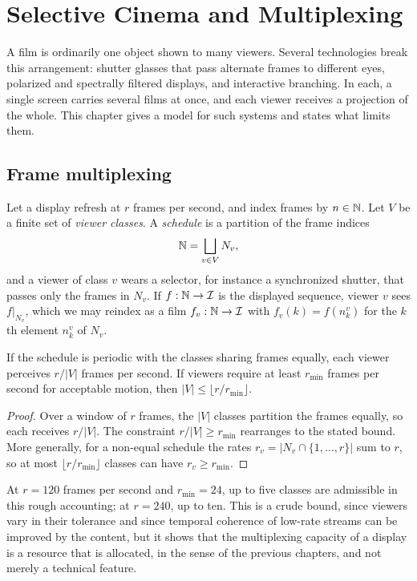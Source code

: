 \chapter{Selective Cinema and Multiplexing}
\label{ch:selective}

A film is ordinarily one object shown to many viewers. Several technologies break this arrangement: shutter glasses that pass alternate frames to different eyes, polarized and spectrally filtered displays, and interactive branching. In each, a single screen carries several films at once, and each viewer receives a projection of the whole. This chapter gives a model for such systems and states what limits them.

\section{Frame multiplexing}

Let a display refresh at $r$ frames per second, and index frames by $n\in\mathbb{N}$. Let $V$ be a finite set of \emph{viewer classes}. A \emph{schedule} is a partition of the frame indices
\[
\mathbb{N}=\bigsqcup_{v\in V}N_v,
\]
and a viewer of class $v$ wears a selector, for instance a synchronized shutter, that passes only the frames in $N_v$. If $f:\mathbb{N}\to\mathcal{I}$ is the displayed sequence, viewer $v$ sees $f|_{N_v}$, which we may reindex as a film $f_v:\mathbb{N}\to\mathcal{I}$ with $f_v(k)=f(n_k^v)$ for the $k$th element $n^v_k$ of $N_v$.

\begin{proposition}\label{prop:rate}
If the schedule is periodic with the classes sharing frames equally, each viewer perceives $r/\lvert V\rvert$ frames per second. If viewers require at least $r_{\min}$ frames per second for acceptable motion, then $\lvert V\rvert\le\lfloor r/r_{\min}\rfloor$.
\end{proposition}

\begin{proof}
Over a window of $r$ frames, the $\lvert V\rvert$ classes partition the frames equally, so each receives $r/\lvert V\rvert$. The constraint $r/\lvert V\rvert\ge r_{\min}$ rearranges to the stated bound. More generally, for a non-equal schedule the rates $r_v=\lvert N_v\cap\{1,\dots,r\}\rvert$ sum to $r$, so at most $\lfloor r/r_{\min}\rfloor$ classes can have $r_v\ge r_{\min}$.
\end{proof}

At $r=120$ frames per second and $r_{\min}=24$, up to five classes are admissible in this rough accounting; at $r=240$, up to ten. This is a crude bound, since viewers vary in their tolerance and since temporal coherence of low-rate streams can be improved by the content, but it shows that the multiplexing capacity of a display is a resource that is allocated, in the sense of the previous chapters, and not merely a technical feature.

